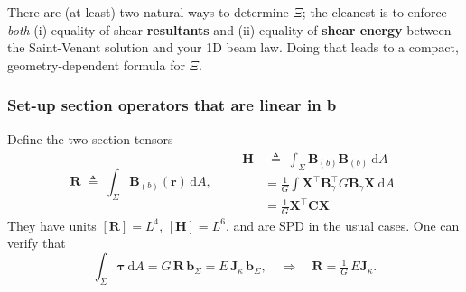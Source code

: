 There are (at least) two natural
ways to determine \(\Xi\); the cleanest is to enforce \emph{both} (i)
equality of shear \textbf{resultants} and (ii) equality of \textbf{shear
energy} between the Saint-Venant solution and your 1D beam law.
Doing that leads to a compact, geometry-dependent formula for \(\Xi\).

\subsubsection{Set-up section operators that are linear in b}

Define the two section tensors 
\[
\mathbf R \;\triangleq\; \int_{\Sigma}\mathbf{B}_{(b)}(\bm{r})\,\mathrm dA,
\qquad
\begin{aligned}
\mathbf H &\;\triangleq\; \int_{\Sigma}\mathbf{B}_{(b)}^{\!\top}\mathbf{B}_{(b)}\mathrm{~d}A \\
&=\frac1G \int\mathbf{X}^{\top}\bm{B}_{\gamma}^{\top}G\bm{B}_{\gamma}\mathbf{X}\mathrm{~d}A \\
&=\frac{1}G \mathbf{X}^{\top}\mathbf{C}\mathbf{X}
\end{aligned}
\]
They have units \([\mathbf R]=L^4\), \([\mathbf H]=L^6\), and are SPD
in the usual cases. One can verify that 
\[
\int_{\Sigma}\bm\tau\mathrm{~d}A  =  G\,\mathbf{R}\,\bm b_{\Sigma}
 =  E\,\mathbf{J}_{\kappa}\,\bm b_{\Sigma},
\quad\Rightarrow\quad
\mathbf R=\tfrac{1}{G}\,E \mathbf{J}_{\kappa}.
\]

